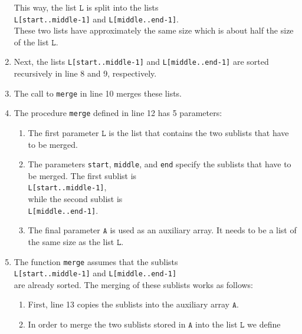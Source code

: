 \begin{enumerate}
      This way, the list $\mathtt{L}$ is split into the lists 
      \\[0.2cm]
      \hspace*{1.3cm}
      \texttt{L[start..middle-1]} \quad and \quad \texttt{L[middle..end-1]}.
      \\[0.2cm]
      These two lists have approximately the same size which is about half the size of the list $\mathtt{L}$.
\item Next, the lists \texttt{L[start..middle-1]} and \texttt{L[middle..end-1]} are sorted
      recursively in line 8 and 9, respectively.
\item The call to \texttt{merge} in line 10 merges these lists.
\item The procedure \texttt{merge} defined in line 12 has 5 parameters: 
      \begin{enumerate}
      \item The first parameter $\mathtt{L}$ is the list that contains the two sublists that have to be merged.
      \item The parameters \texttt{start}, \texttt{middle}, and \texttt{end} specify the sublists
            that have to be merged.  The first sublist is 
            \\[0.2cm]
            \hspace*{1.3cm} 
            \texttt{L[start..middle-1]}, 
            \\[0.2cm]
            while the second sublist is \\[0.2cm]
            \hspace*{1.3cm} 
            \texttt{L[middle..end-1]}. 
      \item The final parameter $\mathtt{A}$ is used as an auxiliary array.  It needs to be a list of the
            same size as the list $\mathtt{L}$.
      \end{enumerate}
\item The function \texttt{merge} assumes that the sublists 
      \\[0.2cm]
      \hspace*{1.3cm}
      \texttt{L[start..middle-1]} \quad and \quad \texttt{L[middle..end-1]} 
      \\[0.2cm]
      are already sorted.  The merging of these sublists works as follows:
      \begin{enumerate}
      \item First, line 13 copies the sublists into the auxiliary array $\mathtt{A}$.
      \item In order to merge the two sublists stored in $\mathtt{A}$ into the list $\mathtt{L}$ we define

\end{enumerate}
\end{enumerate}
